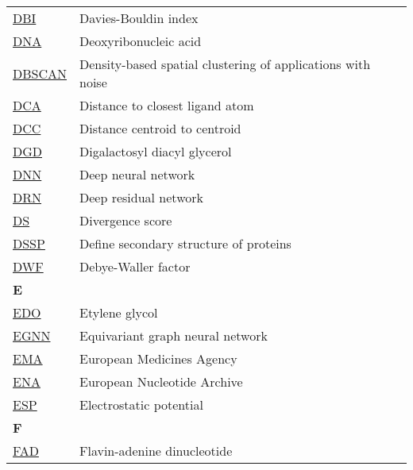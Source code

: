 \begin{longtable}[l]{@{}p{2.5cm}p{12cm}@{}}
\textmd{\href{https://en.wikipedia.org/wiki/Davies–Bouldin_index}{DBI}} & Davies-Bouldin index \\
\textmd{\href{https://en.wikipedia.org/wiki/DNA}{DNA}} & Deoxyribonucleic acid \\
\textmd{\href{https://en.wikipedia.org/wiki/DBSCAN}{DBSCAN}} & Density-based spatial clustering of applications with noise \\
\textmd{\href{https://academic.oup.com/bioinformatics/article/37/12/1681/6104838}{DCA}} & Distance to closest ligand atom \\
\textmd{\href{https://academic.oup.com/bioinformatics/article/37/12/1681/6104838}{DCC}} & Distance centroid to centroid \\
\textmd{\href{https://www.ebi.ac.uk/pdbe-srv/pdbechem/chemicalCompound/show/DGD}{DGD}} & Digalactosyl diacyl glycerol \\
\textmd{\href{https://en.wikipedia.org/wiki/Deep_learning\#Deep_neural_networks}{DNN}} & Deep neural network \\
\textmd{\href{https://en.wikipedia.org/wiki/Residual_neural_network}{DRN}} & Deep residual network \\
\textmd{\href{https://onlinelibrary.wiley.com/doi/10.1002/prot.340110408}{DS}} & Divergence score \\
\textmd{\href{https://en.wikipedia.org/wiki/DSSP_(algorithm)}{DSSP}} & Define secondary structure of proteins \\
\textmd{\href{https://en.wikipedia.org/wiki/Debye–Waller_factor}{DWF}} & Debye-Waller factor \\[0.3175cm]
\textbf{\large E} & \\[0.25cm]
\textmd{\href{https://www.ebi.ac.uk/pdbe-srv/pdbechem/chemicalCompound/show/EDO}{EDO}} & Etylene glycol \\
\textmd{\href{https://arxiv.org/abs/2404.07194}{EGNN}} & Equivariant graph neural network \\
\textmd{\href{https://en.wikipedia.org/wiki/European_Medicines_Agency}{EMA}} & European Medicines Agency \\
\textmd{\href{https://en.wikipedia.org/wiki/European_Nucleotide_Archive}{ENA}} & European Nucleotide Archive \\
\textmd{\href{https://en.wikipedia.org/wiki/Electric_potential}{ESP}} & Electrostatic potential \\[0.3175cm]
\textbf{\large F} & \\[0.25cm]
\textmd{\href{https://www.ebi.ac.uk/pdbe-srv/pdbechem/chemicalCompound/show/FAD}{FAD}} & Flavin-adenine dinucleotide \\

\end{longtable}
